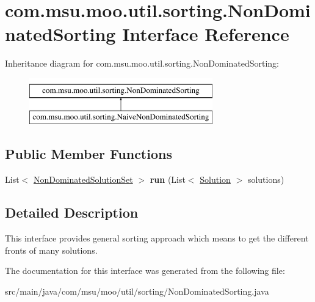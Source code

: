 \hypertarget{interfacecom_1_1msu_1_1moo_1_1util_1_1sorting_1_1NonDominatedSorting}{\section{com.\-msu.\-moo.\-util.\-sorting.\-Non\-Dominated\-Sorting Interface Reference}
\label{interfacecom_1_1msu_1_1moo_1_1util_1_1sorting_1_1NonDominatedSorting}
}
Inheritance diagram for com.\-msu.\-moo.\-util.\-sorting.\-Non\-Dominated\-Sorting\-:\begin{figure}[H]
\begin{center}
\leavevmode
\includegraphics[height=2.000000cm]{interfacecom_1_1msu_1_1moo_1_1util_1_1sorting_1_1NonDominatedSorting}
\end{center}
\end{figure}
\subsection*{Public Member Functions}
\begin{DoxyCompactItemize}
\item 
\hypertarget{interfacecom_1_1msu_1_1moo_1_1util_1_1sorting_1_1NonDominatedSorting_a0d6a8e9261e231598a4f8aa45970bd5a}{List$<$ \hyperlink{classcom_1_1msu_1_1moo_1_1model_1_1solution_1_1NonDominatedSolutionSet}{Non\-Dominated\-Solution\-Set} $>$ {\bfseries run} (List$<$ \hyperlink{classcom_1_1msu_1_1moo_1_1model_1_1solution_1_1Solution}{Solution} $>$ solutions)}\label{interfacecom_1_1msu_1_1moo_1_1util_1_1sorting_1_1NonDominatedSorting_a0d6a8e9261e231598a4f8aa45970bd5a}

\end{DoxyCompactItemize}


\subsection{Detailed Description}
This interface provides general sorting approach which means to get the different fronts of many solutions. 

The documentation for this interface was generated from the following file\-:\begin{DoxyCompactItemize}
\item 
src/main/java/com/msu/moo/util/sorting/Non\-Dominated\-Sorting.\-java\end{DoxyCompactItemize}
